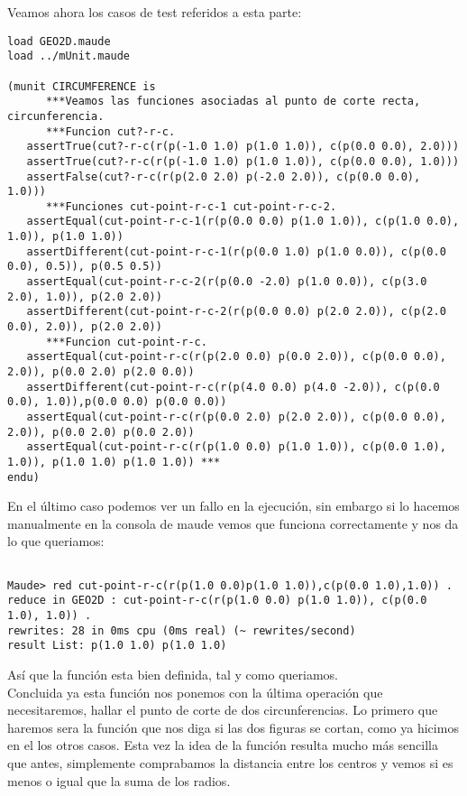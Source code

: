 \documentclass[12pt,a4paper]{book}
\begin{document}
Veamos ahora los casos de test referidos a esta parte:

\begin{verbatim}
load GEO2D.maude
load ../mUnit.maude

(munit CIRCUMFERENCE is 
      ***Veamos las funciones asociadas al punto de corte recta, circunferencia.
      ***Funcion cut?-r-c.
   assertTrue(cut?-r-c(r(p(-1.0 1.0) p(1.0 1.0)), c(p(0.0 0.0), 2.0)))
   assertTrue(cut?-r-c(r(p(-1.0 1.0) p(1.0 1.0)), c(p(0.0 0.0), 1.0)))
   assertFalse(cut?-r-c(r(p(2.0 2.0) p(-2.0 2.0)), c(p(0.0 0.0), 1.0)))
      ***Funciones cut-point-r-c-1 cut-point-r-c-2.
   assertEqual(cut-point-r-c-1(r(p(0.0 0.0) p(1.0 1.0)), c(p(1.0 0.0), 1.0)), p(1.0 1.0))
   assertDifferent(cut-point-r-c-1(r(p(0.0 1.0) p(1.0 0.0)), c(p(0.0 0.0), 0.5)), p(0.5 0.5))
   assertEqual(cut-point-r-c-2(r(p(0.0 -2.0) p(1.0 0.0)), c(p(3.0 2.0), 1.0)), p(2.0 2.0))
   assertDifferent(cut-point-r-c-2(r(p(0.0 0.0) p(2.0 2.0)), c(p(2.0 0.0), 2.0)), p(2.0 2.0))
      ***Funcion cut-point-r-c.
   assertEqual(cut-point-r-c(r(p(2.0 0.0) p(0.0 2.0)), c(p(0.0 0.0), 2.0)), p(0.0 2.0) p(2.0 0.0))
   assertDifferent(cut-point-r-c(r(p(4.0 0.0) p(4.0 -2.0)), c(p(0.0 0.0), 1.0)),p(0.0 0.0) p(0.0 0.0))
   assertEqual(cut-point-r-c(r(p(0.0 2.0) p(2.0 2.0)), c(p(0.0 0.0), 2.0)), p(0.0 2.0) p(0.0 2.0))
   assertEqual(cut-point-r-c(r(p(1.0 0.0) p(1.0 1.0)), c(p(0.0 1.0), 1.0)), p(1.0 1.0) p(1.0 1.0)) *** 
endu)
\end{verbatim}

En el \'ultimo caso podemos ver un fallo en la ejecuci\'on, sin embargo si lo hacemos manualmente en la consola de maude vemos que funciona correctamente y nos da lo que queriamos:

\begin{verbatim}

Maude> red cut-point-r-c(r(p(1.0 0.0)p(1.0 1.0)),c(p(0.0 1.0),1.0)) .
reduce in GEO2D : cut-point-r-c(r(p(1.0 0.0) p(1.0 1.0)), c(p(0.0 1.0), 1.0)) .
rewrites: 28 in 0ms cpu (0ms real) (~ rewrites/second)
result List: p(1.0 1.0) p(1.0 1.0)

\end{verbatim}

As\'i que la funci\'on esta bien definida, tal y como queriamos. \\

Concluida ya esta funci\'on nos ponemos con la \'ultima operaci\'on que necesitaremos, hallar el punto de corte de dos circunferencias. Lo primero que haremos sera la funci\'on que nos diga si las dos figuras se cortan, como ya hicimos en el los otros casos. Esta vez la idea de la funci\'on resulta mucho m\'as sencilla que antes, simplemente comprabamos la distancia entre los centros y vemos si es menos o igual que la suma de los radios. \par
\end{document}
